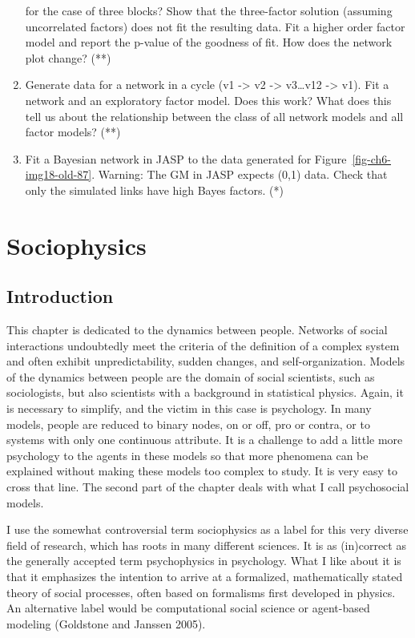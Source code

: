 \documentclass[
  letterpaper,
]{scrbook}
\begin{document}
\begin{enumerate}
  for the case of three blocks? Show that the three-factor solution
  (assuming uncorrelated factors) does not fit the resulting data. Fit a
  higher order factor model and report the p-value of the goodness of
  fit. How does the network plot change? (**)
\item
  Generate data for a network in a cycle (v1 -\textgreater{} v2
  -\textgreater{} v3\ldots v12 -\textgreater{} v1). Fit a network and an
  exploratory factor model. Does this work? What does this tell us about
  the relationship between the class of all network models and all
  factor models? (**)
\item
  Fit a Bayesian network in JASP to the data generated for
  Figure~\ref{fig-ch6-img18-old-87}. Warning: The GM in JASP expects
  (0,1) data. Check that only the simulated links have high Bayes
  factors. (*)
\end{enumerate}


\hypertarget{sociophysics}{%
\chapter{Sociophysics}\label{sociophysics}}

\hypertarget{introduction-4}{%
\section{Introduction}\label{introduction-4}}

This chapter is dedicated to the dynamics between people. Networks of
social interactions undoubtedly meet the criteria of the definition of a
complex system and often exhibit unpredictability, sudden changes, and
self-organization. Models of the dynamics between people are the domain
of social scientists, such as sociologists, but also scientists with a
background in statistical physics. Again, it is necessary to simplify,
and the victim in this case is psychology. In many models, people are
reduced to binary nodes, on or off, pro or contra, or to systems with
only one continuous attribute. It is a challenge to add a little more
psychology to the agents in these models so that more phenomena can be
explained without making these models too complex to study. It is very
easy to cross that line. The second part of the chapter deals with what
I call psychosocial models.

I use the somewhat controversial term sociophysics as a label for this
very diverse field of research, which has roots in many different
sciences. It is as (in)correct as the generally accepted term
psychophysics in psychology. What I like about it is that it emphasizes
the intention to arrive at a formalized, mathematically stated theory of
social processes, often based on formalisms first developed in physics.
An alternative label would be computational social science or
agent-based modeling (Goldstone and Janssen 2005).
\end{document}
